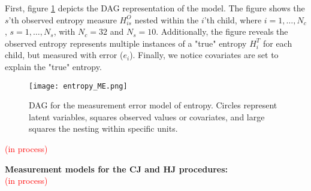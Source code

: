 First, figure \ref{fig:entropy_ME} depicts the DAG representation of the model. The figure shows the $s$'th observed entropy measure $H^{O}_{is}$ nested within the $i$'th child, where $i=1, \dots, N_{c}$, $s=1, \dots, N_{s}$, with $N_{c} = 32$  and $N_{s} = 10$. Additionally, the figure reveals the observed entropy represents multiple instances of a "true" entropy $H^{T}_{i}$ for each child, but measured with error ($e_i$). Finally, we notice covariates are set to explain the "true" entropy.
%
\begin{figure}[h]
	\centering
	\texttt{[image: entropy\_ME.png]}
	\caption[DAG for the measurement error model of entropy.]%
	{DAG for the measurement error model of entropy. Circles represent latent variables, squares observed values or covariates, and large squares the nesting within specific units.}
	\label{fig:entropy_ME}
\end{figure}
%

\textcolor{red}{(in process)} \\

\begin{comment}
- Normal measurement error model: 
entropy_j ~ N( entropy_true_j, sigma_e) 

- In (Faes_et_al_2021) they use a random effects model for the entropy. 
entropy_j = entropy_true_j + error 
error ~ N( 0, sigma_e) 
* Notice both are the same (priors for entropy_true_j are needed) 

- Beta measurement error model: 
entropy_j ~ beta(alpha, beta) 
alpha = mu*M        ->  mu = alpha / M (mean) 
beta = (1 - mu)*M  ->  M = alpha + beta (prior sample size) 
* where mu = entropy_true_j and M is a distribution centered in 10 (utterances) 
\end{comment}
%
%
\noindent \textbf{Measurement models for the CJ and HJ procedures:} \\
%
\textcolor{red}{(in process)}

\begin{comment}

Considering the intelligibility of any stimulus is determined by three interrelated parties: the message, speaker, and listener, and that the inherent variability within each integrating part could be high, the current research assumes the utterances are equivalent among each other.

It will consider the correlation with the entropy measure.
%
\begin{enumerate}
	\item \textbf{Dichotomous CJ (CJ-D):} the Bradley-Terry-Luce model (BTL) \citep{Bradley_et_al_1952, Luce_1959}, used when the comparative judgments are dichotomous (CJ-D), 
	\item \textbf{Ordinal CJ (CJ-O):} the Generalized Bradley-Terry-Luce model BTL(k) \citep{Tutz_1986, Agresti_1992}, used when the comparative ordinal CJ (CJ-O).
	\item \textbf{Absolute (holistic) judgments (HJ):}
\end{enumerate}
\end{comment}
%
%
